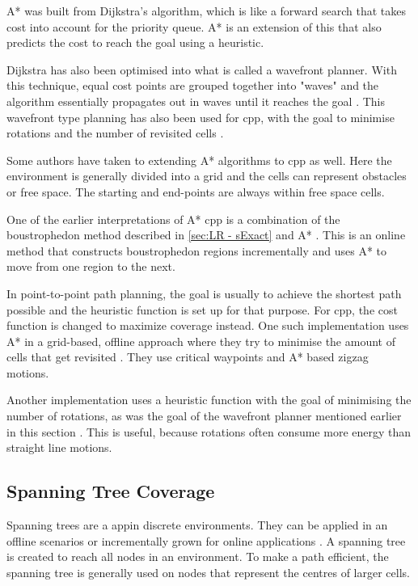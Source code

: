 A* was built from Dijkstra's algorithm, which is like a forward search that takes cost into account for the priority queue. A* is an extension of this that also predicts the cost to reach the goal using a heuristic. 

Dijkstra has also been optimised into what is called a wavefront planner. With this technique, equal cost points are grouped together into "waves" and the algorithm essentially propagates out in waves until it reaches the goal \cite{Lavalle2006}. This wavefront type planning has also been used for \ac{cpp}, with the goal to minimise rotations and the number of revisited cells \cite{Barrientos2011}.

Some authors have taken to extending A* algorithms to \ac{cpp} as well. Here the environment is generally divided into a grid and the cells can represent obstacles or free space. The starting and end-points are always within free space cells.

One of the earlier interpretations of A* \ac{cpp} is a combination of the boustrophedon method described in \ref{sec:LR - sExact} and A* \cite{Viet2012}. This is an online method that constructs boustrophedon regions incrementally and uses A* to move from one region to the next. 

In point-to-point path planning, the goal is usually to achieve the shortest path possible and the heuristic function is set up for that purpose. For \ac{cpp}, the cost function is changed to maximize coverage instead. One such implementation uses A* in a grid-based, offline approach where they try to minimise the amount of cells that get revisited \cite{Le2018}. They use critical waypoints and A* based zigzag motions. 

Another implementation uses a heuristic function with the goal of minimising the number of rotations, as was the goal of the wavefront planner mentioned earlier in this section \cite{Dogru2017}. This is useful, because rotations often consume more energy than straight line motions.
\subsection{Spanning Tree Coverage}
\label{sec: LR - sSTC}
Spanning trees are a appin discrete environments. They can be applied in an offline scenarios or incrementally grown for online applications \cite{Gabriely2001}. A spanning tree is created to reach all nodes in an environment. To make a path efficient, the spanning tree is generally used on nodes that represent the centres of larger cells. 

